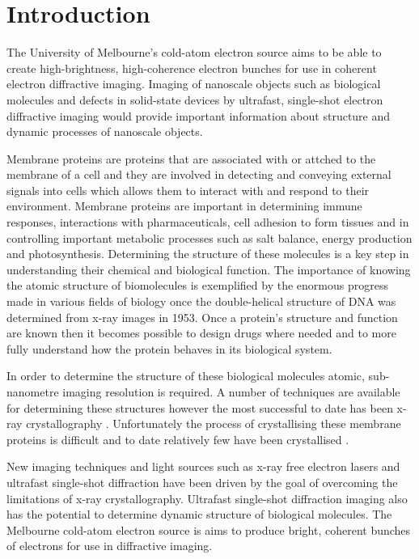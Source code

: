 \section{Introduction}

The University of Melbourne's cold-atom electron source aims to be able to create high-brightness, high-coherence electron bunches for use in coherent electron diffractive imaging. Imaging of nanoscale objects such as biological molecules\cite{dwyer_femtosecond_2006, williamson_clocking_1997} and defects in solid-state devices\cite{siwick_atomic-level_2003} by ultrafast, single-shot electron diffractive imaging would provide important information about structure and dynamic processes of nanoscale objects.

Membrane proteins are proteins that are associated with or attched to the membrane of a cell and they are involved in detecting and conveying external signals into cells which allows them to interact with and respond to their environment\cite{almen_mapping_2009}. Membrane proteins are important in determining immune responses, interactions with pharmaceuticals, cell adhesion to form tissues and in controlling important metabolic processes such as salt balance, energy production and photosynthesis\cite{chiras_human_2011}. Determining the structure of these molecules is a key step in understanding their chemical and biological function. The importance of knowing the atomic structure of biomolecules is exemplified by the enormous progress made in various fields of biology once the double-helical structure of DNA was determined from x-ray images in 1953\cite{watson_molecular_1953}. Once a protein's structure and function are known then it becomes possible to design drugs\cite{pinto_influenza_1992} where needed and to more fully understand how the protein behaves in its biological system.

In order to determine the structure of these biological molecules atomic, sub-nanometre imaging resolution is required. A number of techniques are available for determining these structures \cite{nettleship_methods_2008, svergun_small-angle_2003, opella_structure_2004} however the most successful to date has been x-ray crystallography \cite{kendrew_three-dimensional_1958, uson_advances_1999}. Unfortunately the process of crystallising these membrane proteins is difficult and to date relatively few have been crystallised \cite{geerlof_impact_2006}.

New imaging techniques and light sources such as x-ray free electron lasers and  ultrafast single-shot diffraction have been driven by the goal of overcoming the limitations of x-ray crystallography. Ultrafast single-shot diffraction imaging also has the potential to determine dynamic structure of biological molecules. The Melbourne cold-atom electron source is aims to produce bright, coherent bunches of electrons for use in diffractive imaging.


